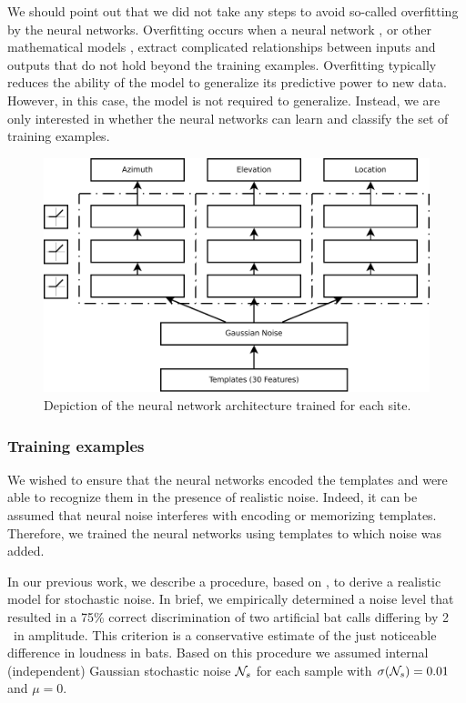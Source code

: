 \documentclass[preprint,5p]{elsarticle}
\begin{document}
We should point out that we did not take any steps to avoid so-called overfitting by the neural networks. Overfitting occurs when a neural network \citep{Ghotra2017}, or other mathematical models \citep{Hawkins2004}, extract complicated relationships between inputs and outputs that do not hold beyond the training examples. Overfitting typically reduces the ability of the model to generalize its predictive power to new data. However, in this case, the model is not required to generalize. Instead, we are only interested in whether the neural networks can learn and classify the set of training examples.

\begin{figure}
	\centering
	\includegraphics[width=1\linewidth]{figures/networks}
	\caption{Depiction of the neural network architecture trained for each site.}
	\label{fig:networks}
\end{figure}

\subsubsection{Training examples}

We wished to ensure that the neural networks encoded the templates and were able to recognize them in the presence of realistic noise. Indeed, it can be assumed that neural noise interferes with encoding or memorizing templates. Therefore, we trained the neural networks using templates to which noise was added.

In our previous work, we describe a procedure, based on \citet{Dau1996}, to derive a realistic model for stochastic noise. In brief, we empirically determined a noise level that resulted in a 75\% correct discrimination of two artificial bat calls differing by 2 \db\ in amplitude. This criterion is a conservative estimate of the just noticeable difference in loudness in bats. Based on this procedure we assumed internal (independent) Gaussian stochastic noise $\mathcal{N}_s$ for each sample with $\sigma(\mathcal{N}_s) = 0.01$ and $\mu=0$.
\end{document}
